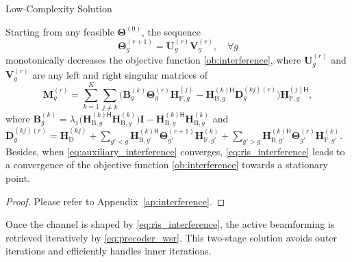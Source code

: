 \documentclass[
	fontsize=11pt,
	paper=a4,
	foldmarks=false
]{scrartcl}
\begin{document}
\begin{reviewer}
{{\begin{subsubsection}{Low-Complexity Solution}
					\begin{proposition}
						Starting from any feasible $\mathbf{\Theta}^{(0)}$, the sequence
						\begin{equation*}
							\mathbf{\Theta}_g^{(r+1)} = \mathbf{U}_g^{(r)} \mathbf{V}_g^{(r)}, \quad \forall g
						\end{equation*}
						monotonically decreases the objective function \eqref{ob:interference},
						where $\mathbf{U}_g^{(r)}$ and $\mathbf{V}_g^{(r)}$ are any left and right singular matrices of
						\begin{equation*}
							\mathbf{M}_g^{(r)} = \sum_{k=1}^K \sum_{j \ne k} \bigl(\mathbf{B}_g^{(k)} \mathbf{\Theta}_g^{(r)} \mathbf{H}^{(j)}_{\mathrm{F},g} - {\mathbf{H}^{(k)\mathsf{H}}_{\mathrm{B},g}} {\mathbf{D}^{(kj)(r)}_{g}}\bigr) {\mathbf{H}^{(j)\mathsf{H}}_{\mathrm{F},g}},
						\end{equation*}
						where $\mathbf{B}_g^{(k)} = \lambda_1\bigl({\mathbf{H}^{(k)\mathsf{H}}_{\mathrm{B},g}} \mathbf{H}^{(k)}_{\mathrm{B},g}\bigr) \mathbf{I} - {\mathbf{H}^{(k)\mathsf{H}}_{\mathrm{B},g}} \mathbf{H}^{(k)}_{\mathrm{B},g}$ and ${\mathbf{D}^{(kj)(r)}_{g}} = \mathbf{H}^{(kj)}_\mathrm{D} + \sum_{g'<g} {\mathbf{H}_{\mathrm{B},g'}^{(k)\mathsf{H}}} \mathbf{\Theta}_{g'}^{(r+1)} \mathbf{H}_{\mathrm{F},g'}^{(k)} + \sum_{g'>g} {\mathbf{H}_{\mathrm{B},g'}^{(k)\mathsf{H}}} \mathbf{\Theta}_{g'}^{(r)} \mathbf{H}_{\mathrm{F},g'}^{(k)}.$
						Besides, when \eqref{eq:auxiliary_interference} converges, \eqref{eq:ris_interference} leads to a convergence of the objective function \eqref{ob:interference} towards a stationary point.
					\end{proposition}
					\begin{proof}
						Please refer to Appendix~\ref{ap:interference}.
					\end{proof}
					Once the channel is shaped by \eqref{eq:ris_interference}, the active beamforming is retrieved iteratively by \eqref{eq:precoder_wsr}.
					This two-stage solution avoids outer iterations and efficiently handles inner iterations.
				\end{subsubsection}
		}

}
\end{reviewer}
\end{document}
